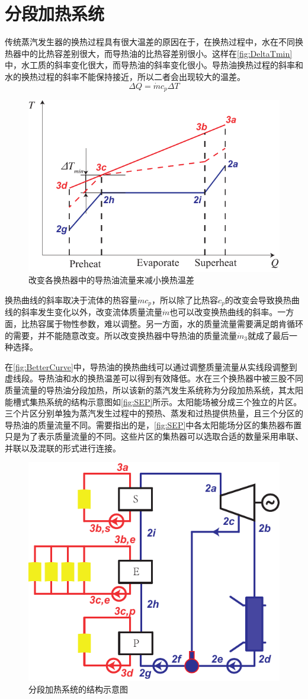 \section{分段加热系统}
\label{sec:melrs}

传统蒸汽发生器的换热过程具有很大温差的原因在于，在换热过程中，水在不同换热器中的比热容差别很大，而导热油的比热容差别很小。这样在\autoref{fig:DeltaTmin}中，水工质的斜率变化很大，而导热油的斜率变化很小。导热油换热过程的斜率和水的换热过程的斜率不能保持接近，所以二者会出现较大的温差。
\begin{equation}
  \Delta Q = \dot{m} c_p\Delta T
\end{equation}

\begin{figure}[htbp]
\centering
	\includegraphics[width = 0.5\columnwidth]{fig/BetterCurve}
	\caption{改变各换热器中的导热油流量来减小换热温差}
	\label{fig:BetterCurve}
\end{figure}

换热曲线的斜率取决于流体的热容量$\dot{m}c_p$，所以除了比热容$c_p$的改变会导致换热曲线的斜率发生变化以外，改变流体质量流量$\dot{m}$也可以改变换热曲线的斜率。一方面，比热容属于物性参数，难以调整。另一方面，水的质量流量需要满足朗肯循环的需要，并不能随意改变。所以改变换热器中导热油的质量流量$\dot{m}_3$就成了最后一种选择。

在\autoref{fig:BetterCurve}中，导热油的换热曲线可以通过调整质量流量从实线段调整到虚线段。导热油和水的换热温差可以得到有效降低。水在三个换热器中被三股不同质量流量的导热油分段加热，所以该新的蒸汽发生系统称为分段加热系统，其太阳能槽式集热系统的结构示意图如\autoref{fig:SEP}所示。太阳能场被分成三个独立的片区。三个片区分别单独为蒸汽发生过程中的预热、蒸发和过热提供热量，且三个分区的导热油的质量流量不同。需要指出的是，\autoref{fig:SEP}中各太阳能场分区的集热器布置只是为了表示质量流量的不同。这些片区的集热器可以选取合适的数量采用串联、并联以及混联的形式进行连接。

\begin{figure}[htbp]
\centering
	\includegraphics[width = 0.5\columnwidth]{fig/SEP}
	\caption{分段加热系统的结构示意图}
	\label{fig:SEP}
\end{figure}

